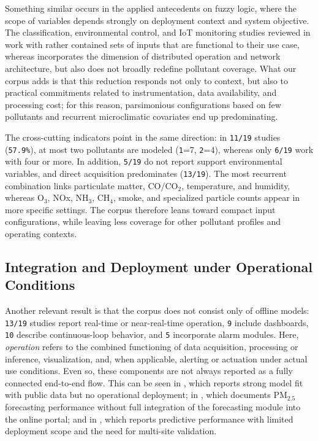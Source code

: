 Something similar occurs in the applied antecedents on fuzzy logic, where the scope of variables depends strongly on deployment context and system objective. The classification, environmental control, and IoT monitoring studies reviewed in \cite{ART04,ART05,ART06,ART07} work with rather contained sets of inputs that are functional to their use case, whereas \cite{ART08} incorporates the dimension of distributed operation and network architecture, but also does not broadly redefine pollutant coverage. What our corpus adds is that this reduction responds not only to context, but also to practical commitments related to instrumentation, data availability, and processing cost; for this reason, parsimonious configurations based on few pollutants and recurrent microclimatic covariates end up predominating.

The cross-cutting indicators point in the same direction: in \texttt{11/19} studies (\texttt{57.9\%}), at most two pollutants are modeled (\texttt{1}=7, \texttt{2}=4), whereas only \texttt{6/19} work with four or more. In addition, \texttt{5/19} do not report support environmental variables, and direct acquisition predominates (\texttt{13/19}). The most recurrent combination links particulate matter, CO/CO$_2$, temperature, and humidity, whereas O$_3$, NOx, NH$_3$, CH$_4$, smoke, and specialized particle counts appear in more specific settings. The corpus therefore leans toward compact input configurations, while leaving less coverage for other pollutant profiles and operating contexts.

\subsection{Integration and Deployment under Operational Conditions}
Another relevant result is that the corpus does not consist only of offline models: \texttt{13/19} studies report real-time or near-real-time operation, \texttt{9} include dashboards, \texttt{10} describe continuous-loop behavior, and \texttt{5} incorporate alarm modules. Here, \emph{operation} refers to the combined functioning of data acquisition, processing or inference, visualization, and, when applicable, alerting or actuation under actual use conditions. Even so, these components are not always reported as a fully connected end-to-end flow. This can be seen in \cite{A028}, which reports strong model fit with public data but no operational deployment; in \cite{A135}, which documents PM$_{2.5}$ forecasting performance without full integration of the forecasting module into the online portal; and in \cite{A144}, which reports predictive performance with limited deployment scope and the need for multi-site validation.


